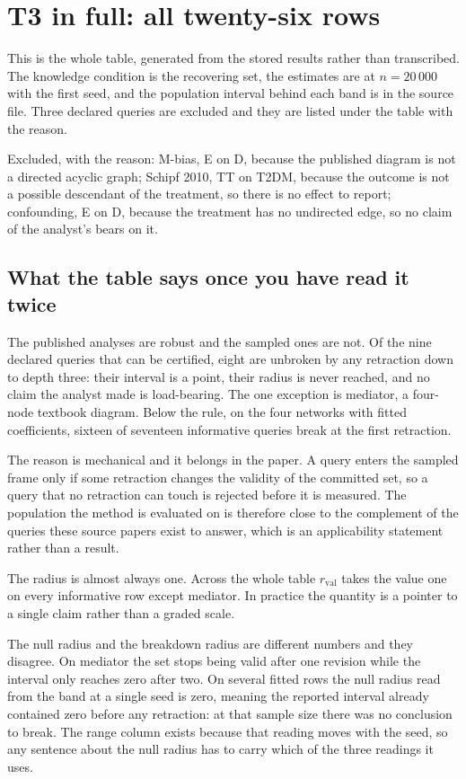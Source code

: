 \clearpage
\section{T3 in full: all twenty-six rows}

This is the whole table, generated from the stored results rather than transcribed. The knowledge
condition is the recovering set, the estimates are at $n = 20\,000$ with the first seed, and the
population interval behind each band is in the source file. Three declared queries are excluded and
they are listed under the table with the reason.



\noindent Excluded, with the reason: M-bias, E on D, because the published diagram is not a
directed acyclic graph; Schipf 2010, TT on T2DM, because the outcome is not a possible descendant of
the treatment, so there is no effect to report; confounding, E on D, because the treatment has no
undirected edge, so no claim of the analyst's bears on it.

\subsection{What the table says once you have read it twice}

The published analyses are robust and the sampled ones are not. Of the nine declared queries that
can be certified, eight are unbroken by any retraction down to depth three: their interval is a
point, their radius is never reached, and no claim the analyst made is load-bearing. The one
exception is mediator, a four-node textbook diagram. Below the rule, on the four networks with
fitted coefficients, sixteen of seventeen informative queries break at the first retraction.

The reason is mechanical and it belongs in the paper. A query enters the sampled frame only if some
retraction changes the validity of the committed set, so a query that no retraction can touch is
rejected before it is measured. The population the method is evaluated on is therefore close to the
complement of the queries these source papers exist to answer, which is an applicability statement
rather than a result.

The radius is almost always one. Across the whole table $r_{\mathrm{val}}$ takes the value one on
every informative row except mediator. In practice the quantity is a pointer to a single claim
rather than a graded scale.

The null radius and the breakdown radius are different numbers and they disagree. On mediator the
set stops being valid after one revision while the interval only reaches zero after two. On several
fitted rows the null radius read from the band at a single seed is zero, meaning the reported
interval already contained zero before any retraction: at that sample size there was no conclusion
to break. The range column exists because that reading moves with the seed, so any sentence about
the null radius has to carry which of the three readings it uses.


